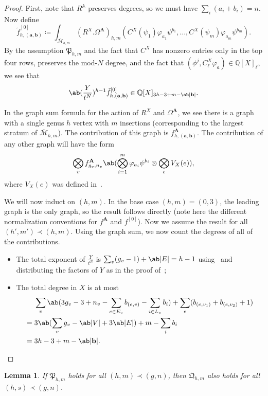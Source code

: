 \documentclass[10pt]{amsart}
\newtheorem{lem}[thm]{Lemma}
\theoremstyle{definition}
\theoremstyle{remark}
\theoremstyle{plain}
\theoremstyle{definition}
\theoremstyle{remark}
\newcommand{\A}{\mathbb{A}}
\newcommand{\Q}{\mathbb{Q}}
\newcommand{\ba}{\mathbf{a}}
\newcommand{\bb}{\mathbf{b}}
\newcommand{\bA}{\mathbf{A}}
\newcommand{\msc}[1]{\mathscr{#1}}
\newcommand{\mf}[1]{\mathfrak{#1}}
\newcommand{\ol}[1]{\overline{#1}}
\newcommand{\1}{\mathbf{1}}
\newcommand{\2}{\mathbf{2}}
\newcommand{\3}{\mathbf{3}}
\numberwithin{equation}{section}
\begin{document}
\begin{proof}
    First, note that $R^{\A}$ preserves degrees, so we must have $\sum_i (a_i + b_i) = n$. Now define
    \[ \tilde{f}_{h,(\ba,\bb)}^{[0]} \coloneqq \int_{\ol{\msc{M}}_{h,m}} (R^X.\Omega^{\bA})_{h,m}(C^X(\psi_1)\varphi_{a_1}\psi^{b_1}, \ldots, C^X(\psi_m)\varphi_{a_m} \psi^{b_m}). \]
    By the assumption $\mf{P}_{h,m}$ and the fact that $C^X$ has nonzero entries only in the top four rows, preserves the mod-$N$ degree, and the fact that $(\phi^j, C_{\ell}^X \varphi_a) \in \Q[X]_{\ell}$, we see that
    \[ \ab(\frac{Y}{t^N})^{h-1}\tilde{f}_{h,(\ba,\bb)}^{[0]} \in \Q[X]_{3h-3+m-\ab|\bb|}. \]

    In the graph sum formula for the action of $R^X$ and $\Omega^{\bA}$, we see there is a graph with a single genus $h$ vertex with $m$ insertions (corresponding to the largest stratum of $\ol{\msc{M}}_{h,m}$). The contribution of this graph is $f_{h,(\ba,\bb)}^{\bA}$. The contribution of any other graph will have the form
    \[ \bigotimes_{v} f^{\bA}_{g_v, n_v} \ab(\bigotimes_{i=1}^m \varphi_{a_i} \psi^{b_i} \otimes \bigotimes_{e} V_X(e)), \]
    where $V_X(e)$ was defined in~. 

    We will now induct on $(h,m)$. In the base case $(h,m) = (0,3)$, the leading graph is the only graph, so the result follows directly (note here the different normalization conventions for $f^{\bA}$ and $f^{[0]}$). Now we assume the result for all $(h',m') \prec (h,m)$. Using the graph sum, we now count the degrees of all of the contributions.
    \begin{itemize}
        \item The total exponent of $\frac{Y}{t^N}$ is $\sum_{v} (g_v-1) + \ab|E| = h-1$ using~ and distributing the factors of $Y$ as in the proof of~\cite[Theorem 6.1]{polynomiality};
        \item The total degree in $X$ is at most
            \begin{align*}
                &\sum_v \ab(3g_v-3+n_v-\sum_{e\in E_v} b_{(e,v)} - \sum_{i \in L_v} b_i) + \sum_e (b_{ (e,v_1) }+b_{(e,v_2)}+1) \\
                ={}& 3 \ab(\sum_v g_v - \ab|V| + 3\ab|E|) + m - \sum_i b_i \\
                ={}& 3h-3+m - \ab|\bb|. \qedhere
            \end{align*}
    \end{itemize}
\end{proof}

\begin{lem}\label{lem:pimpliesq}
    If $\mf{P}_{h,m}$ holds for all $(h,m) \prec (g,n)$, then $\mf{Q}_{h,m}$ also holds for all $(h,s) \prec (g,n)$.
\end{lem}
\end{document}
